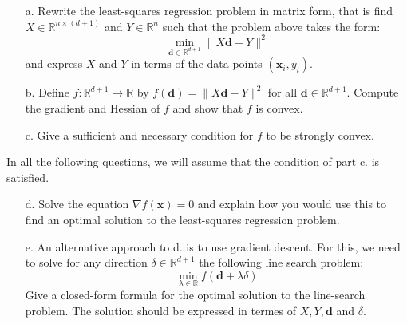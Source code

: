 \documentclass[11pt]{article}
\theoremstyle{remark}
\newcommand{\R}{\mathbb{R}}                     %
\newcommand{\bx}{\mathbf{x}}
\newcommand{\bd}{\mathbf{d}}
\begin{document}
\begin{itemize}
    \item[a.] Rewrite the least-squares regression problem in matrix form, that
        is find $X\in\R^{n\times (d+1)}$ and $Y\in\R^n$ such that the problem
        above takes the form:
        \begin{displaymath}
            \min_{\bd\in\R^{d+1}} \|X\bd-Y\|^2
        \end{displaymath}
        and express $X$ and $Y$ in terms of the data points $(\bx_i, y_i)$.
    \item[b.] Define $f:\R^{d+1}\to\R$ by $f(\bd) = \|X\bd-Y\|^2$ for all
        $\bd\in\R^{d+1}$. Compute the gradient and Hessian of $f$ and show that
        $f$ is convex.
    \item[c.] Give a sufficient and necessary condition for $f$ to be strongly
        convex.
\end{itemize}
In all the following questions, we will assume that the condition of part c. is
satisfied.
\begin{itemize}
    \item[d.] Solve the equation $\nabla f(\bx) = 0$ and explain how you would
        use this to find an optimal solution to the least-squares regression
        problem.
    \item[e.] An alternative approach to d. is to use gradient descent. For
        this, we need to solve for any direction $\delta\in\R^{d+1}$ the
        following line search problem:
        \begin{displaymath}
            \min_{\lambda\in\R} f(\bd+\lambda\delta)
        \end{displaymath}
        Give a closed-form formula for the optimal solution to the line-search
        problem. The solution should be expressed in termes of $X, Y, \bd$ and
        $\delta$.
\end{itemize}
\end{document}
